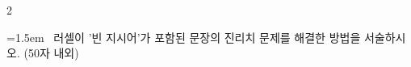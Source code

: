 \documentclass[10pt, a4paper]{article}
\begin{document}
\begin{multicols}{2}
\begin{minipage}{\columnwidth}
\vspace{3mm}
\noindent\hrulefill
\vspace{2.5mm}
\noindent\hrulefill
\vspace{2.5mm}
\noindent\hrulefill
\vspace{2.5mm}
\noindent\hrulefill
\vspace{2.5mm}
\noindent\hrulefill
\vspace{2.5mm}
\vspace{1mm}
\vspace{4mm}
\end{minipage}
\par

\noindent\begin{minipage}{\columnwidth}
\vspace{2mm}
{\hangindent=1.5em  ~러셀이 '빈 지시어'가 포함된 문장의 진리치 문제를 해결한 방법을 서술하시오. (50자 내외)\par}

\vspace{3mm}
\noindent\hrulefill
\vspace{2.5mm}
\noindent\hrulefill
\vspace{2.5mm}
\noindent\hrulefill
\vspace{2.5mm}
\noindent\hrulefill
\vspace{2.5mm}
\noindent\hrulefill
\vspace{2.5mm}
\vspace{1mm}
\vspace{4mm}
\end{minipage}
\par


\vspace{1mm}
\vspace{0.5mm}


\end{multicols}
\end{document}
